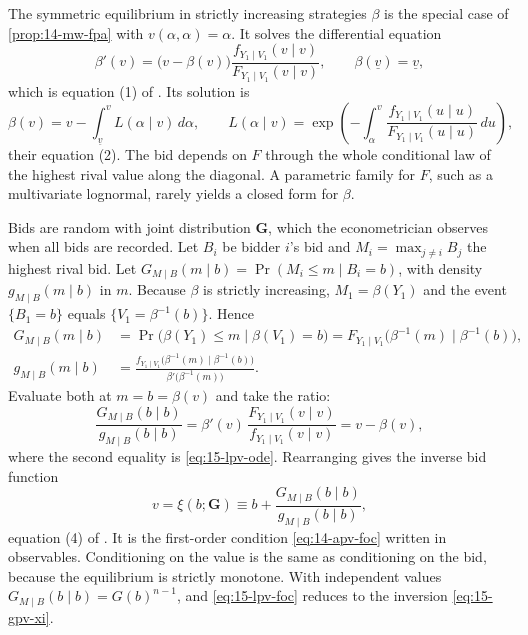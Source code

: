 The symmetric equilibrium in strictly increasing strategies $\beta$ is the special case of
\cref{prop:14-mw-fpa} with $v(\alpha,\alpha)=\alpha$. It solves the differential equation
\begin{equation}\label{eq:15-lpv-ode}
  \beta'(v)=\bigl(v-\beta(v)\bigr)\frac{f_{Y_1\mid V_1}(v\mid v)}{F_{Y_1\mid V_1}(v\mid v)},
  \qquad \beta(\underline v)=\underline v,
\end{equation}
which is equation (1) of \citet{LiPerrigneVuong2002}. Its solution is
\begin{equation}\label{eq:15-lpv-bid}
  \beta(v)=v-\int_{\underline v}^{v}L(\alpha\mid v)\,d\alpha,
  \qquad
  L(\alpha\mid v)=\exp\left(-\int_\alpha^v\frac{f_{Y_1\mid V_1}(u\mid u)}{F_{Y_1\mid V_1}(u\mid u)}\,du\right),
\end{equation}
their equation (2). The bid depends on $F$ through the whole conditional law of the highest rival value
along the diagonal. A parametric family for $F$, such as a multivariate lognormal, rarely yields a closed
form for $\beta$.

 Bids are random with joint distribution
$\bm G$, which the econometrician observes when all bids are recorded. Let $B_i$ be bidder $i$'s bid and
$M_i=\max_{j\ne i}B_j$ the highest rival bid. Let $G_{M\mid B}(m\mid b)=\Pr(M_i\le m\mid B_i=b)$, with
density $g_{M\mid B}(m\mid b)$ in $m$. Because $\beta$ is strictly increasing, $M_1=\beta(Y_1)$ and the
event $\{B_1=b\}$ equals $\{V_1=\beta^{-1}(b)\}$. Hence
\begin{align*}
  G_{M\mid B}(m\mid b)&=\Pr\bigl(\beta(Y_1)\le m\mid \beta(V_1)=b\bigr)
  =F_{Y_1\mid V_1}\bigl(\beta^{-1}(m)\mid\beta^{-1}(b)\bigr),\\
  g_{M\mid B}(m\mid b)&=\frac{f_{Y_1\mid V_1}\bigl(\beta^{-1}(m)\mid\beta^{-1}(b)\bigr)}{\beta'\bigl(\beta^{-1}(m)\bigr)}.
\end{align*}
Evaluate both at $m=b=\beta(v)$ and take the ratio:
\begin{equation*}
  \frac{G_{M\mid B}(b\mid b)}{g_{M\mid B}(b\mid b)}
  =\beta'(v)\,\frac{F_{Y_1\mid V_1}(v\mid v)}{f_{Y_1\mid V_1}(v\mid v)}
  =v-\beta(v),
\end{equation*}
where the second equality is \eqref{eq:15-lpv-ode}. Rearranging gives the inverse bid function
\begin{equation}\label{eq:15-lpv-foc}
  v=\xi(b;\bm G)\equiv b+\frac{G_{M\mid B}(b\mid b)}{g_{M\mid B}(b\mid b)},
\end{equation}
equation (4) of \citet{LiPerrigneVuong2002}. It is the first-order condition \eqref{eq:14-apv-foc}
written in observables. Conditioning on the value is the same as conditioning on the bid, because the
equilibrium is strictly monotone. With independent values $G_{M\mid B}(b\mid b)=G(b)^{n-1}$, and
\eqref{eq:15-lpv-foc} reduces to the inversion \eqref{eq:15-gpv-xi}.

